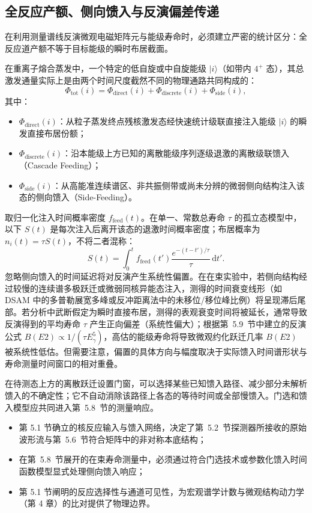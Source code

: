 \subsection{全反应产额、侧向馈入与反演偏差传递}\label{subsec:5-1-5}

在利用测量谱线反演微观电磁矩阵元与能级寿命时，必须建立严密的统计区分：全反应道产额不等于目标能级的瞬时布居截面。

在重离子熔合蒸发中，一个特定的低自旋或中自旋能级 $|i\rangle$（如带内 $4^+$ 态），其总激发通量实际上是由两个时间尺度截然不同的物理通路共同构成的：
\begin{equation}\label{eq:5-1-feeding-split}
\Phi_{\mathrm{tot}}(i) = \Phi_{\mathrm{direct}}(i) + \Phi_{\mathrm{discrete}}(i) + \Phi_{\mathrm{side}}(i),
\end{equation}
其中：
\begin{itemize}
\item $\Phi_{\mathrm{direct}}(i)$：从粒子蒸发终点残核激发态经快速统计级联直接注入能级 $|i\rangle$ 的瞬发直接布居份额；
\item $\Phi_{\mathrm{discrete}}(i)$：沿本能级上方已知的离散能级序列逐级退激的离散级联馈入（Cascade Feeding）；
\item $\Phi_{\mathrm{side}}(i)$：从高能准连续谱区、非共振侧带或尚未分辨的微弱侧向结构注入该态的侧向馈入（Side-Feeding）。
\end{itemize}

取归一化注入时间概率密度 $f_{\mathrm{feed}}(t)$。在单一、常数总寿命 $\tau$ 的孤立态模型中，以下 $S(t)$ 是每次注入后离开该态的退激时间概率密度；布居概率为 $n_i(t)=\tau S(t)$，不将二者混称：
\begin{equation}\label{eq:5-1-feeding-conv}
S(t) = \int_0^t f_{\mathrm{feed}}(t') \frac{e^{-(t - t')/\tau}}{\tau} \, \mathrm{d}t'.
\end{equation}
忽略侧向馈入的时间延迟将对反演产生系统性偏置。在在束实验中，若侧向结构经过较慢的连续谱多极跃迁或微弱同核异能态注入，测得的时间衰变线形（如 DSAM 中的多普勒展宽多峰或反冲距离法中的未移位/移位峰比例）将呈现滞后尾部。若分析中武断假定为瞬时直接布居，测得的表观衰变时间将被延长，通常导致反演得到的平均寿命 $\tau$ 产生正向偏差（系统性偏大）；根据第~5.9~节中建立的反演公式 $B(E2) \propto 1/(\tau E_\gamma^5)$，高估的能级寿命将导致微观约化跃迁几率 $B(E2)$ 被系统性低估。但需要注意，偏置的具体方向与幅度取决于实际馈入时间谱形状与寿命测量时间窗口的相对重叠。

在待测态上方的离散跃迁设置门窗，可以选择某些已知馈入路径、减少部分未解析馈入的不确定性；它不自动消除该路径上各态的等待时间或全部慢馈入。门选和馈入模型应共同进入第~5.8~节的测量响应。
\begin{itemize}
\item 第 5.1 节确立的核反应输入与馈入网络，决定了第~5.2~节探测器所接收的原始波形流与第~5.6~节符合矩阵中的非对称本底结构；
\item 在第~5.8~节展开的在束寿命测量中，必须通过符合门选技术或参数化馈入时间函数模型显式处理侧向馈入响应；
\item 第 5.1 节阐明的反应选择性与通道可见性，为宏观谱学计数与微观结构动力学（第 4 章）的比对提供了物理边界。
\end{itemize}
